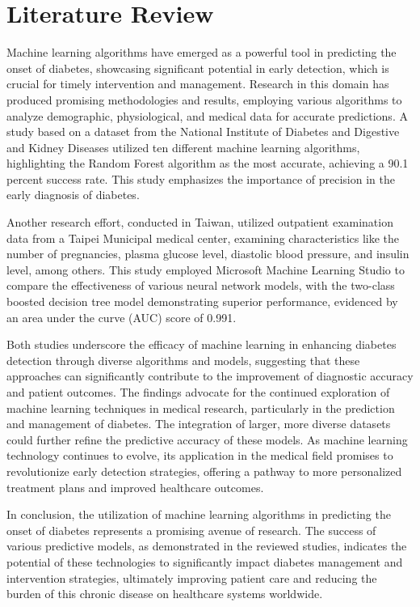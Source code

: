 \documentclass[a4paper,num-refs,gigabyte]{oup-contemporary}
\begin{document}
\section{Literature Review}
Machine learning algorithms have emerged as a powerful tool in predicting the onset of diabetes, showcasing significant potential in early detection, which is crucial for timely intervention and management. Research in this domain has produced promising methodologies and results, employing various algorithms to analyze demographic, physiological, and medical data for accurate predictions. A study based on a dataset from the National Institute of Diabetes and Digestive and Kidney Diseases utilized ten different machine learning algorithms, highlighting the Random Forest algorithm as the most accurate, achieving a 90.1 percent success rate. This study emphasizes the importance of precision in the early diagnosis of diabetes.

Another research effort, conducted in Taiwan, utilized outpatient examination data from a Taipei Municipal medical center, examining characteristics like the number of pregnancies, plasma glucose level, diastolic blood pressure, and insulin level, among others. This study employed Microsoft Machine Learning Studio to compare the effectiveness of various neural network models, with the two-class boosted decision tree model demonstrating superior performance, evidenced by an area under the curve (AUC) score of 0.991.

Both studies underscore the efficacy of machine learning in enhancing diabetes detection through diverse algorithms and models, suggesting that these approaches can significantly contribute to the improvement of diagnostic accuracy and patient outcomes. The findings advocate for the continued exploration of machine learning techniques in medical research, particularly in the prediction and management of diabetes. The integration of larger, more diverse datasets could further refine the predictive accuracy of these models. As machine learning technology continues to evolve, its application in the medical field promises to revolutionize early detection strategies, offering a pathway to more personalized treatment plans and improved healthcare outcomes.

In conclusion, the utilization of machine learning algorithms in predicting the onset of diabetes represents a promising avenue of research. The success of various predictive models, as demonstrated in the reviewed studies, indicates the potential of these technologies to significantly impact diabetes management and intervention strategies, ultimately improving patient care and reducing the burden of this chronic disease on healthcare systems worldwide.
\end{document}
